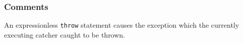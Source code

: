 \begin{mathpar}
\end{mathpar}

\subsubsection{Comments}
An expressionless \texttt{throw} statement causes the exception which the
currently executing catcher caught to be thrown.
